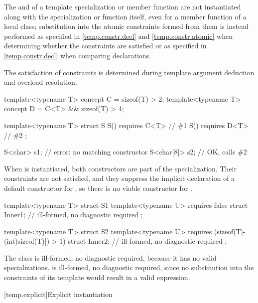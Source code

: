 \pnum
The  and 
of a template specialization or member function
are not instantiated along with the specialization or function itself,
even for a member function of a local class;
substitution into the atomic constraints formed from them is instead performed
as specified in \ref{temp.constr.decl} and \ref{temp.constr.atomic}
when determining whether the constraints are satisfied
or as specified in \ref{temp.constr.decl} when comparing declarations.
\begin{note}
The satisfaction of constraints is determined during
template argument deduction and
overload resolution.
\end{note}
\begin{example}
\begin{codeblock}
template<typename T> concept C = sizeof(T) > 2;
template<typename T> concept D = C<T> && sizeof(T) > 4;

template<typename T> struct S {
  S() requires C<T> { }         // \#1
  S() requires D<T> { }         // \#2
};

S<char> s1;                     // error: no matching constructor
S<char[8]> s2;                  // OK, calls \#2
\end{codeblock}
When  is instantiated, both constructors are part of the
specialization. Their constraints are not satisfied, and
they suppress the implicit declaration of a default constructor for
, so there is no viable constructor
for .
\end{example}
\begin{example}
\begin{codeblock}
template<typename T> struct S1 {
  template<typename U>
    requires false
  struct Inner1;                // ill-formed, no diagnostic required
};

template<typename T> struct S2 {
  template<typename U>
    requires (sizeof(T[-(int)sizeof(T)]) > 1)
  struct Inner2;                // ill-formed, no diagnostic required
};
\end{codeblock}
The class  is ill-formed, no diagnostic required, because
it has no valid specializations.
 is ill-formed, no diagnostic required, since no substitution into
the constraints of its  template would result in a valid
expression.
\end{example}

[temp.explicit]{Explicit instantiation}

